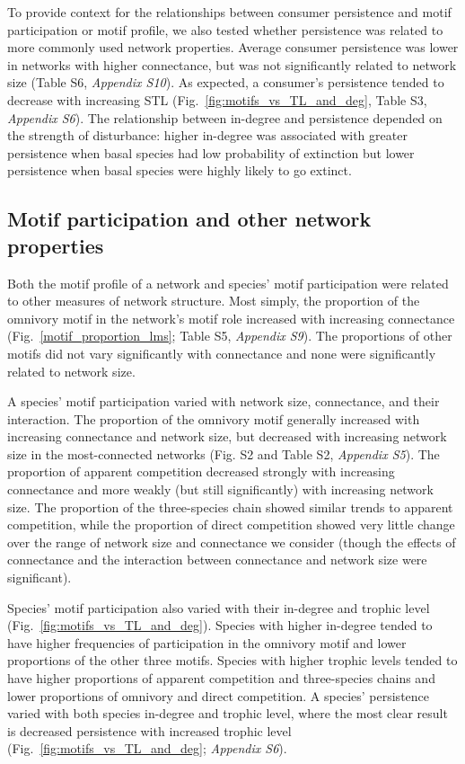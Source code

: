 \documentclass[12pt]{article}
\begin{document}
\begin{spacing}{2.0}
        To provide context for the relationships between consumer persistence and motif participation or motif profile, we also tested whether persistence was related to more commonly used network properties.
        Average consumer persistence was lower in networks with higher connectance, but was not significantly related to network size (Table S6, \emph{Appendix S10}).
        As expected, a consumer's persistence tended to decrease with increasing STL (Fig.~\ref{fig:motifs_vs_TL_and_deg}, Table S3, \emph{Appendix S6}).
        The relationship between in-degree and persistence depended on the strength of disturbance: higher in-degree was associated with greater persistence when basal species had low probability of extinction but lower persistence when basal species were highly likely to go extinct.


    \subsection*{Motif participation and other network properties}

        Both the motif profile of a network and species' motif participation were related to other measures of network structure.
        Most simply, the proportion of the omnivory motif in the network's motif role increased with increasing connectance (Fig.~\ref{motif_proportion_lms}; Table S5, \emph{Appendix S9}).
        The proportions of other motifs did not vary significantly with connectance and none were significantly related to network size.


        A species' motif participation varied with network size, connectance, and their interaction. 
        The proportion of the omnivory motif generally increased with increasing connectance and network size, but decreased with increasing network size in the most-connected networks (Fig. S2 and Table S2, \emph{Appendix S5}).
        The proportion of apparent competition decreased strongly with increasing connectance and more weakly (but still significantly) with increasing network size.
        The proportion of the three-species chain showed similar trends to apparent competition, while the proportion of direct competition showed very little change over the range of network size and connectance we consider (though the effects of connectance and the interaction between connectance and network size were significant).

        
        Species' motif participation also varied with their in-degree and trophic level (Fig.~\ref{fig:motifs_vs_TL_and_deg}).
        Species with higher in-degree tended to have higher frequencies of participation in the omnivory motif and lower proportions of the other three motifs.
        Species with higher trophic levels tended to have higher proportions of apparent competition and three-species chains and lower proportions of omnivory and direct competition. 
        A species' persistence varied with both species in-degree and trophic level, where the most clear result is decreased persistence with increased trophic level (Fig.~\ref{fig:motifs_vs_TL_and_deg}; \emph{Appendix S6}). 
        

\end{spacing}
\end{document}
